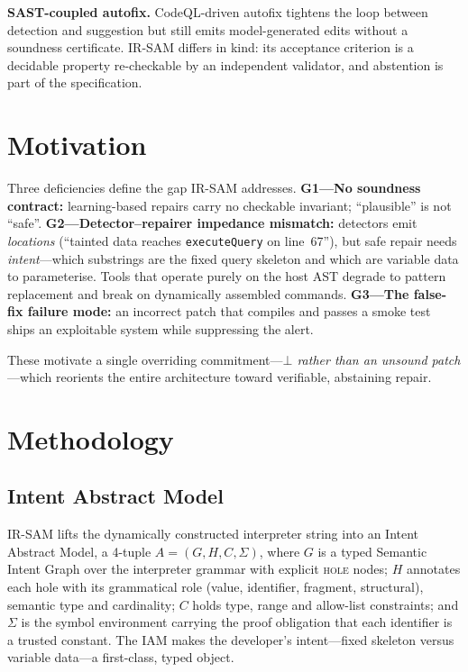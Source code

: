 \documentclass[conference]{IEEEtran}
\newcommand{\bottom}{\ensuremath{\bot}}
\newcommand{\irsam}{IR-SAM}
\newcommand{\code}[1]{\texttt{\small #1}}
\begin{document}
\textbf{SAST-coupled autofix.} CodeQL-driven autofix
\cite{anand2025codeqlautofix} tightens the loop between detection and
suggestion but still emits model-generated edits without a soundness
certificate. \irsam{} differs in kind: its acceptance criterion is a
decidable property re-checkable by an independent validator, and
abstention is part of the specification.

\section{Motivation}
Three deficiencies define the gap \irsam{} addresses.
\textbf{G1---No soundness contract:} learning-based repairs carry no
checkable invariant; ``plausible'' is not ``safe''.
\textbf{G2---Detector--repairer impedance mismatch:} detectors emit
\emph{locations} (``tainted data reaches \code{executeQuery} on line~67''),
but safe repair needs \emph{intent}---which substrings are the fixed query
skeleton and which are variable data to parameterise. Tools that operate
purely on the host AST degrade to pattern replacement and break on
dynamically assembled commands.
\textbf{G3---The false-fix failure mode:} an incorrect patch that compiles
and passes a smoke test ships an exploitable system while suppressing the
alert.

These motivate a single overriding commitment---\emph{\bottom{} rather
than an unsound patch}---which reorients the entire architecture toward
verifiable, abstaining repair.

\section{Methodology}
\label{sec:method}

\subsection{Intent Abstract Model}
\irsam{} lifts the dynamically constructed interpreter string into an
Intent Abstract Model, a 4-tuple $A=(G,H,C,\Sigma)$, where $G$ is a typed
Semantic Intent Graph over the interpreter grammar with explicit
\textsc{hole} nodes; $H$ annotates each hole with its grammatical role
(\textsf{value}, \textsf{identifier}, \textsf{fragment},
\textsf{structural}), semantic type and cardinality; $C$ holds type,
range and allow-list constraints; and $\Sigma$ is the symbol environment
carrying the proof obligation that each identifier is a trusted constant.
The IAM makes the developer's intent---fixed skeleton versus variable
data---a first-class, typed object.
\end{document}
